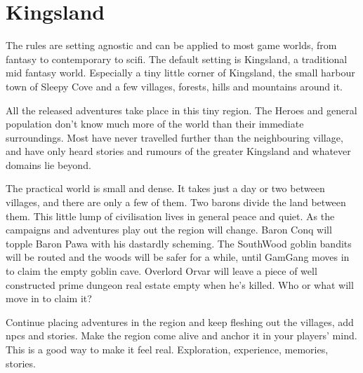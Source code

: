 \clearpage %


\section*{Kingsland}

The rules are setting agnostic and can be applied to most game worlds, from fantasy to contemporary to scifi. The default setting is Kingsland, a traditional mid fantasy world. Especially a tiny little corner of Kingsland, the small harbour town of Sleepy Cove and a few villages, forests, hills and mountains around it.

All the released adventures take place in this tiny region. The Heroes and general population don't know much more of the world than their immediate surroundings. Most have never travelled further than the neighbouring village, and have only heard stories and rumours of the greater Kingsland and whatever domains lie beyond.

The practical world is small and dense. It takes just a day or two between villages, and there are only a few of them. Two barons divide the land between them. This little lump of civilisation lives in general peace and quiet. As the campaigns and adventures play out the region will change. Baron Conq will topple Baron Pawa with his dastardly scheming. The SouthWood goblin bandits will be routed and the woods will be safer for a while, until GamGang moves in to claim the empty goblin cave. Overlord Orvar will leave a piece of well constructed prime dungeon real estate empty when he's killed. Who or what will move in to claim it?

Continue placing adventures in the region and keep fleshing out the villages, add npcs and stories. Make the region come alive and anchor it in your players' mind. This is a good way to make it feel real. Exploration, experience, memories, stories.



\vfill

